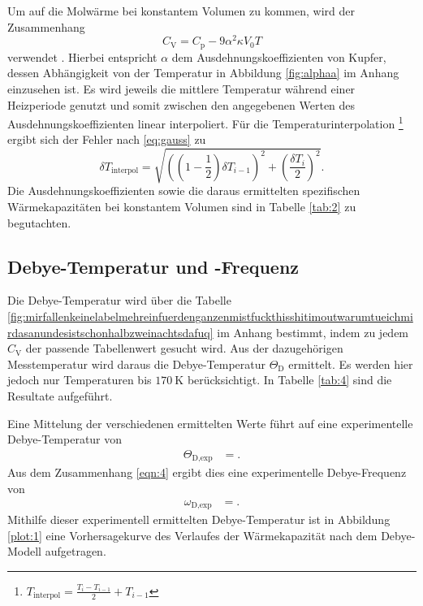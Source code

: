 

Um auf die Molwärme bei konstantem Volumen zu kommen, wird der Zusammenhang
\begin{equation}
  C_{\text{V}} = C_{\text{p}} - 9 \alpha^2 \kappa V_0 T
\end{equation}
verwendet \cite{skript}.
Hierbei entspricht $\alpha$ dem Ausdehnungskoeffizienten von Kupfer, dessen Abhängigkeit von der Temperatur in Abbildung \ref{fig:alphaa} im Anhang einzusehen ist.
Es wird jeweils die mittlere Temperatur während einer Heizperiode genutzt und somit zwischen den angegebenen Werten des Ausdehnungskoeffizienten linear interpoliert.
Für die Temperaturinterpolation \footnote{$T_\text{interpol} = \frac{T_{i} - T_{i-1}}{2} + T_{i-1}$ } ergibt sich der Fehler nach \eqref{eq:gauss} zu
\begin{equation}
  \delta T_\text{interpol} = \sqrt{ \left(\left(1 - \frac{1}{2}\right) \delta T_{i-1}\right)^2 + \left(\frac{\delta T_{i}}{2}\right)^2 }.
\end{equation}
Die Ausdehnungskoeffizienten sowie die daraus ermittelten spezifischen Wärmekapazitäten bei konstantem Volumen sind in Tabelle \ref{tab:2} zu begutachten.



\subsection{Debye-Temperatur und -Frequenz}

Die Debye-Temperatur wird über die Tabelle \ref{fig:mirfallenkeinelabelmehreinfuerdenganzenmistfuckthisshitimoutwarumtueichmirdasanundesistschonhalbzweinachtsdafuq} im Anhang bestimmt, indem zu jedem $C_{\text{V}}$ der passende Tabellenwert gesucht wird.
Aus der dazugehörigen Messtemperatur wird daraus die Debye-Temperatur $\Theta_\text{D}$ ermittelt.
Es werden hier jedoch nur Temperaturen bis $\SI{170}{\kelvin}$ berücksichtigt.
In Tabelle \ref{tab:4} sind die Resultate aufgeführt.



Eine Mittelung der verschiedenen ermittelten Werte führt auf eine experimentelle Debye-Temperatur von
\begin{align*}
  \Theta_{\text{D,exp}} &= .
\end{align*}
Aus dem Zusammenhang \eqref{eqn:4} ergibt dies eine experimentelle Debye-Frequenz von
\begin{align*}
  \omega_{\text{D,exp}} &= .
\end{align*}
Mithilfe dieser experimentell ermittelten Debye-Temperatur ist in Abbildung \ref{plot:1} eine Vorhersagekurve des Verlaufes der Wärmekapazität nach dem Debye-Modell aufgetragen.

